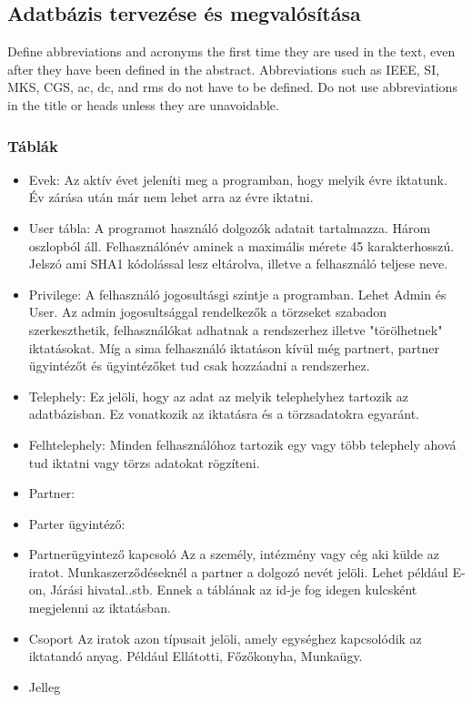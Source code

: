 \documentclass[conference]{IEEEtran}
\begin{document}
\subsection{Adatbázis tervezése és megvalósítása}\label{AA}
Define abbreviations and acronyms the first time they are used in the text, 
even after they have been defined in the abstract. Abbreviations such as 
IEEE, SI, MKS, CGS, ac, dc, and rms do not have to be defined. Do not use 
abbreviations in the title or heads unless they are unavoidable.

\subsubsection{Táblák}
\begin{itemize}
	\item Evek:
	Az aktív évet jeleníti meg a programban, hogy melyik évre iktatunk. Év zárása után már nem lehet arra az évre iktatni.
	\item User tábla:
	A programot használó dolgozók adatait tartalmazza. Három oszlopból áll. Felhasználónév aminek a maximális mérete 45 karakterhosszú. Jelszó ami SHA1 kódolással lesz eltárolva, illetve a felhasználó teljese neve.
	\item Privilege:
	A felhasználó jogosultásgi szintje a programban. Lehet Admin és User. Az admin jogosultsággal rendelkezők a törzseket szabadon szerkeszthetik, felhasználókat adhatnak a rendszerhez illetve "törölhetnek" iktatásokat.
	Míg a sima felhasználó iktatáson kívül még partnert, partner ügyintézőt és ügyintézőket tud csak hozzáadni a rendszerhez.
	\item Telephely:
	Ez jelöli, hogy az adat az melyik telephelyhez tartozik az adatbázisban. Ez vonatkozik az iktatásra és a törzsadatokra egyaránt.	
	\item Felhtelephely:	
	Minden felhasználóhoz tartozik egy vagy több telephely ahová tud iktatni vagy törzs adatokat rögzíteni. 
	\item Partner:	
	\item Parter ügyintéző:
	\item Partnerügyintező kapcsoló
	Az a személy, intézmény vagy cég aki külde az iratot. Munkaszerződéseknél a partner a dolgozó nevét jelöli. Lehet például E-on, Járási hivatal..stb. Ennek a táblának az id-je fog idegen kulcsként megjelenni az iktatásban.
	\item Csoport
	Az iratok azon típusait jelöli, amely egységhez kapcsolódik az iktatandó anyag. Például Ellátotti, Főzőkonyha, Munkaügy.
	\item Jelleg

\end{itemize}
\end{document}

